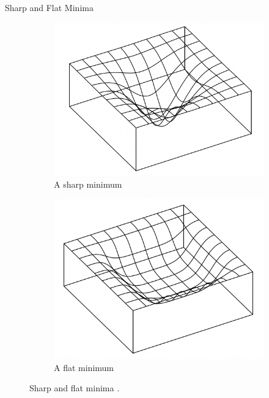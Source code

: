\documentclass{beamer}
\begin{document}
\begin{frame}{Sharp and Flat Minima}
    \begin{figure}
        \centering
        \begin{subfigure}[b]{0.4\textwidth}
            \centering
            \includegraphics[width=\textwidth]{sharp_minimum}
            \caption{A sharp minimum}
            \label{fig:sharp_minimum}
        \end{subfigure}
        \begin{subfigure}[b]{0.4\textwidth}
            \centering
            \includegraphics[width=\textwidth]{flat_minimum}
            \caption{A flat minimum}
            \label{fig:flat_minimum}
        \end{subfigure}
        \caption{Sharp and flat minima \cite{pml2Book}.}
        \label{fig:sharp_and_flat_minima}
    \end{figure}
\end{frame}
\end{document}
